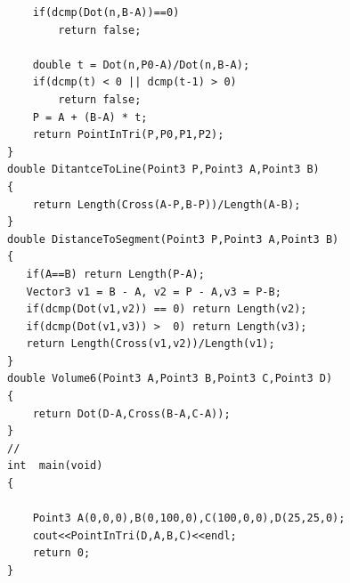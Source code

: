 \documentclass[twoside]{article}
\begin{document}
\begin{lstlisting}
    if(dcmp(Dot(n,B-A))==0)
        return false;

    double t = Dot(n,P0-A)/Dot(n,B-A);
    if(dcmp(t) < 0 || dcmp(t-1) > 0)
        return false;
    P = A + (B-A) * t;
    return PointInTri(P,P0,P1,P2);
}
double DitantceToLine(Point3 P,Point3 A,Point3 B)
{
    return Length(Cross(A-P,B-P))/Length(A-B);
}
double DistanceToSegment(Point3 P,Point3 A,Point3 B)
{
   if(A==B) return Length(P-A);
   Vector3 v1 = B - A, v2 = P - A,v3 = P-B;
   if(dcmp(Dot(v1,v2)) == 0) return Length(v2);
   if(dcmp(Dot(v1,v3)) >  0) return Length(v3);
   return Length(Cross(v1,v2))/Length(v1);
}
double Volume6(Point3 A,Point3 B,Point3 C,Point3 D)
{
    return Dot(D-A,Cross(B-A,C-A));
}
// 
int  main(void)
{

    Point3 A(0,0,0),B(0,100,0),C(100,0,0),D(25,25,0);
    cout<<PointInTri(D,A,B,C)<<endl;
    return 0;
}\end{lstlisting}
\end{document}
